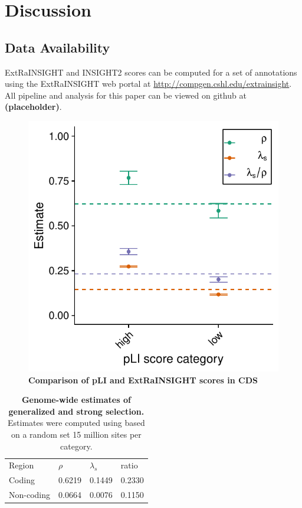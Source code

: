 \documentclass[11pt]{article}
\newcommand{\placeholder}{\textbf{(placeholder)}}
\begin{document}
\section*{Discussion}

\subsection*{Data Availability}

ExtRaINSIGHT and INSIGHT2 scores can be computed for a set of annotations using the ExtRaINSIGHT web portal at \url{http://compgen.cshl.edu/extrainsight}. All pipeline and analysis for this paper can be viewed on github at \placeholder.



\begin{figure}[t]
    \centering
    \includegraphics[width=0.5\linewidth]{figures/pLI_ratio.pdf}
    \caption{\textbf{Comparison of pLI and ExtRaINSIGHT scores in CDS}}
    \label{fig:pli}
\end{figure}

\begin{table}[t]
    \centering
	\begin{tabular}{@{}llll@{}}
		Region     & $\rho$ & $\lambda_s$ & ratio  \\ %
		Coding     & 0.6219 & 0.1449     & 0.2330 \\
		Non-coding & 0.0664 & 0.0076     & 0.1150 \\ %
	\end{tabular}
	\caption{\textbf{Genome-wide estimates of generalized and strong selection.} Estimates were computed using  based on a random set 15 million sites per category. }
	\label{tab:genome_wide_scores}
\end{table}
\end{document}
